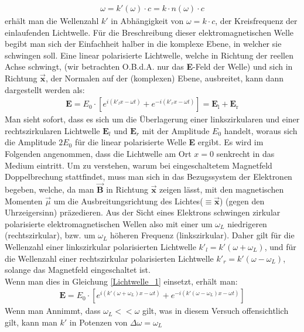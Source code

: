 \documentclass[12pt,a4paper]{article}
\begin{document}
\begin{align}
\omega = k'(\omega)\cdot c = k\cdot n(\omega)\cdot c
\label{Dispersionsrelation}
\end{align}
erhält man die Wellenzahl $k'$ in Abhängigkeit von $\omega = k\cdot c$, der Kreisfrequenz der einlaufenden Lichtwelle.
Für die Breschreibung dieser elektromagnetischen Welle begibt man sich der Einfachheit halber in die komplexe Ebene, in welcher sie schwingen soll. Eine linear polarisierte Lichtwelle, welche in Richtung der reellen Achse schwingt, (wir betrachten O.B.d.A. nur das \textbf{E}-Feld der Welle) und sich in Richtung $\vec{\textbf{x}}$, der Normalen auf der (komplexen) Ebene, ausbreitet, kann dann dargestellt werden als:
 \begin{align}
\textbf{E} = E_0\cdot[e^{i( k'_l x - \omega t)}+e^{-i( k'_r x - \omega t )}] = \textbf{E}_{\text{l}} + \textbf{E}_{\text{r}}
\label{Lichtwelle_1}
 \end{align}
Man sieht sofort, dass es sich um die Überlagerung einer linkszirkularen und einer rechtszirkularen Lichtwelle $\textbf{E}_l$ und $\textbf{E}_r$ mit der Amplitude $E_0$ handelt, woraus sich die Amplitude $2E_0$ für die linear polarisierte Welle \textbf{E} ergibt.\newpage \noindent
Es wird im Folgenden angenommen, dass die Lichtwelle am Ort $x=0$ senkrecht in das Medium eintritt.  Um zu verstehen, warum bei eingeschaltetem Magnetfeld Doppelbrechung stattfindet, muss man sich in das Bezugssystem der Elektronen begeben, welche, da man $\vec{\textbf{B}}$ in Richtung $\vec{\textbf{x}}$ zeigen lässt, mit den magnetischen Momenten $\vec{\mu}$ um die Ausbreitungsrichtung des Lichtes($ \equiv \vec{\textbf{x}}$) (gegen den Uhrzeigersinn) präzedieren. Aus der Sicht eines Elektrons schwingen zirkular polarisierte elektromagnetischen Wellen also mit einer um $\omega_L$ niedrigeren (rechtszirkular), bzw. um $\omega_L$ höheren Frequenz (linkszirkular). Daher gilt für die Wellenzahl einer linkszirkular polarisierten Lichtwelle $k'_l = k'(\omega + \omega_L)$, und für die Wellenzahl einer rechtszirkular polarisierten Lichtwelle $k'_r = k'(\omega - \omega_L)$, solange das Magnetfeld eingeschaltet ist.\\
Wenn man dies in Gleichung \ref{Lichtwelle_1} einsetzt, erhält man:
\begin{align}
\textbf{E} = E_0\cdot[e^{i(k'(\omega + \omega_L) x - \omega t)}+e^{-i(k'(\omega - \omega_L) x - \omega t)}]
\label{Lichtwelle_2}
\end{align}
Wenn man Annimmt, dass $\omega_L << \omega$ gilt, was in diesem Versuch offensichtlich gilt, kann man $k'$ in Potenzen von $\Delta \omega = \omega_L$
\end{document}
